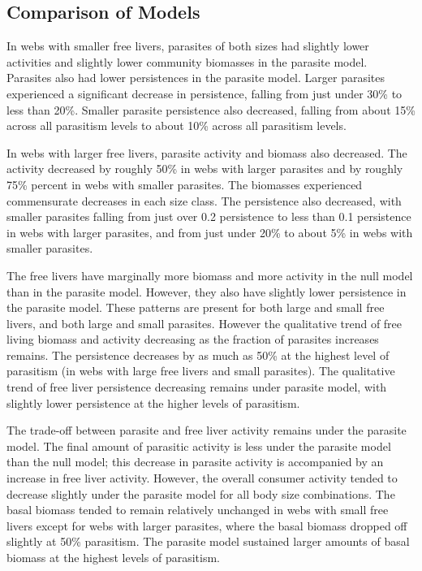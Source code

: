 \documentclass[/home/nkappler/Research/Dissertation/dissertation.tex]{subfiles}
\begin{document}
\begin{bibunit}
\subsection{Comparison of Models}

In webs with smaller free livers, parasites of both sizes had slightly lower
activities and slightly lower community biomasses in the parasite model.
Parasites also had lower persistences in the parasite model. Larger parasites
experienced a significant decrease in persistence, falling from just under 30\%
to less than 20\%. Smaller parasite persistence also decreased, falling
from about 15\% across all parasitism levels to about 10\% across all parasitism
levels. 

In webs with larger free livers, parasite activity and biomass also decreased.
The activity decreased by roughly 50\% in webs with larger parasites and by
roughly 75\% percent in webs with smaller parasites. The biomasses experienced
commensurate decreases in each size class. The persistence also decreased, with
smaller parasites falling from just over 0.2 persistence to less than 0.1
persistence in webs with larger parasites, and from just under 20\% to about
5\% in webs with smaller parasites.

The free livers have marginally more biomass and more activity in the null
model than in the parasite model. However, they also have slightly lower
persistence in the parasite model. These patterns are present for both large
and small free livers, and both large and small parasites. However the
qualitative trend of free living biomass and activity decreasing as the
fraction of parasites increases remains.  The persistence decreases by as much
as 50\% at the highest level of parasitism (in webs with large free livers and
small parasites). The qualitative trend of free liver persistence decreasing
remains under parasite model, with slightly lower persistence at the higher
levels of parasitism.

The trade-off between parasite and free liver activity remains under the
parasite model. The final amount of parasitic activity is less under the
parasite model than the null model; this decrease in parasite activity is
accompanied by an increase in free liver activity. However, the overall
consumer activity tended to decrease slightly under the parasite model for all
body size combinations. The basal biomass tended to remain relatively unchanged
in webs with small free livers except for webs with larger parasites, where the
basal biomass dropped off slightly at 50\% parasitism. The parasite model
sustained larger amounts of basal biomass at the highest levels of parasitism.


\end{bibunit}
\end{document}
